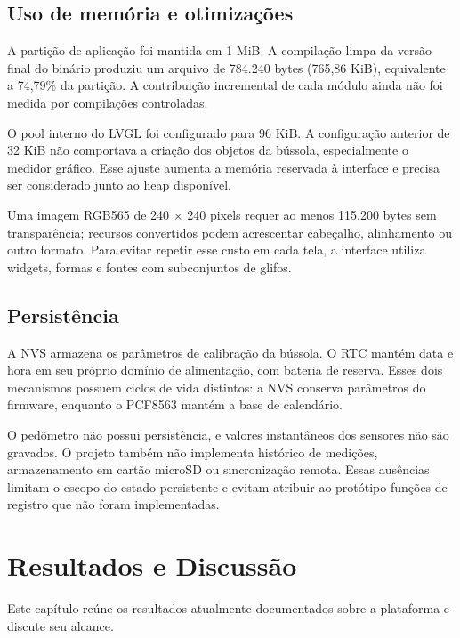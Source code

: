 \documentclass[a4paper,12pt]{article}
\begin{document}
\subsection{Uso de mem\'oria e otimiza\c{c}\~oes}


A parti\c{c}\~ao de aplica\c{c}\~ao foi mantida em 1 MiB. A compila\c{c}\~ao limpa da vers\~ao final do bin\'ario produziu um arquivo de 784.240 bytes (765,86 KiB), equivalente a 74,79\% da parti\c{c}\~ao. A contribui\c{c}\~ao incremental de cada m\'odulo ainda n\~ao foi medida por compila\c{c}\~oes controladas.


O pool interno do LVGL foi configurado para 96 KiB. A configura\c{c}\~ao anterior de 32 KiB n\~ao comportava a cria\c{c}\~ao dos objetos da b\'ussola, especialmente o medidor gr\'afico. Esse ajuste aumenta a mem\'oria reservada \`a interface e precisa ser considerado junto ao heap dispon\'ivel.


Uma imagem RGB565 de 240 $\times$ 240 pixels requer ao menos 115.200 bytes sem transpar\^encia; recursos convertidos podem acrescentar cabe\c{c}alho, alinhamento ou outro formato. Para evitar repetir esse custo em cada tela, a interface utiliza widgets, formas e fontes com subconjuntos de glifos.


\subsection{Persist\^encia}


A NVS armazena os par\^ametros de calibra\c{c}\~ao da b\'ussola. O RTC mant\'em data e hora em seu pr\'oprio dom\'inio de alimenta\c{c}\~ao, com bateria de reserva. Esses dois mecanismos possuem ciclos de vida distintos: a NVS conserva par\^ametros do firmware, enquanto o PCF8563 mant\'em a base de calend\'ario.


O ped\^ometro n\~ao possui persist\^encia, e valores instant\^aneos dos sensores n\~ao s\~ao gravados. O projeto tamb\'em n\~ao implementa hist\'orico de medi\c{c}\~oes, armazenamento em cart\~ao microSD ou sincroniza\c{c}\~ao remota. Essas aus\^encias limitam o escopo do estado persistente e evitam atribuir ao prot\'otipo fun\c{c}\~oes de registro que n\~ao foram implementadas.

\clearpage
\section{Resultados e Discuss\~ao}


Este cap\'itulo re\'une os resultados atualmente documentados sobre a plataforma e discute seu alcance.
\end{document}
